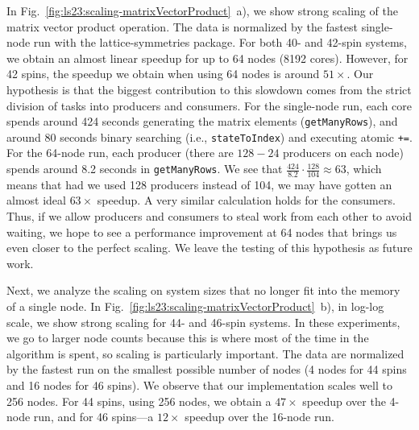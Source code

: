 In Fig.~\ref{fig:ls23:scaling-matrixVectorProduct}~a), we show strong scaling of the matrix vector product operation. The data is normalized by the fastest single-node run with the lattice-symmetries package. For both 40- and 42-spin systems, we obtain an almost linear speedup for up to 64 nodes (8192 cores). However, for 42 spins, the speedup we obtain when using 64 nodes is around $51\times$. Our hypothesis is that the biggest contribution to this slowdown comes from the strict division of tasks into producers and consumers. For the single-node run, each core spends around 424 seconds generating the matrix elements (\verb|getManyRows|), and around 80 seconds binary searching (i.e., \verb|stateToIndex|) and executing atomic \verb|+=|. For the 64-node run, each producer (there are $128 - 24$ producers on each node) spends around 8.2 seconds in \verb|getManyRows|. We see that $\frac{424}{8.2}\cdot \frac{128}{104} \approx 63$, which means that had we used 128 producers instead of 104, we may have gotten an almost ideal $63\times$ speedup. A very similar calculation holds for the consumers. Thus, if we allow producers and consumers to steal work from each other to avoid waiting, we hope to see a performance improvement at 64 nodes that brings us even closer to the perfect scaling. We leave the testing of this hypothesis as future work.

Next, we analyze the scaling on system sizes that no longer fit into the memory of a single node. In Fig.~\ref{fig:ls23:scaling-matrixVectorProduct}~b), in log-log scale, we show strong scaling for 44- and 46-spin systems. In these experiments, we go to larger node counts because this is where most of the time in the algorithm is spent, so scaling is particularly important. The data are normalized by the fastest run on the smallest possible number of nodes (4 nodes for 44 spins and 16 nodes for 46 spins). We observe that our implementation scales well to 256 nodes. For 44 spins, using 256 nodes, we obtain a $47 \times$ speedup over the 4-node run, and for 46 spins---a $12\times$ speedup over the 16-node run.


